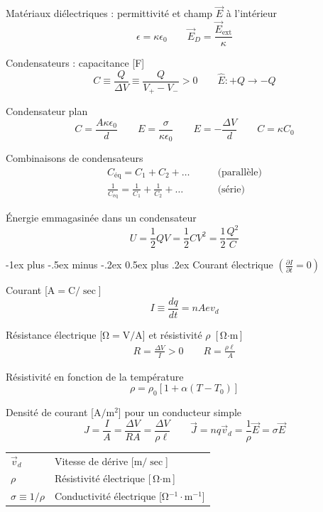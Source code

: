 \documentclass[10pt,landscape]{article}
\makeatletter
\renewcommand{\section}{\@startsection{section}{1}{0mm}%
                                {-1ex plus -.5ex minus -.2ex}%
                                {0.5ex plus .2ex}%
                                {\normalfont\large\bfseries}}
\newcommand{\halfline}{\vspace{0.5em}}
\newcommand{\tableindent}{\hspace{1.5em}}
\newcommand{\uvec}[1]{\ensuremath{{\hat{#1}}}}
\makeatother
\begin{document}
\begin{multicols}{3}
Matériaux diélectriques : permittivité et champ $\vec{E}$ à l'intérieur
\[ \epsilon = \kappa \epsilon_0 
\qquad\vec{E}_D = \frac{\vec{E}_\text{ext}}{\kappa}\]

Condensateurs : capacitance [\si{\farad}] 
\[ C \equiv \frac{Q}{\Delta V} \equiv \frac{Q}{V_+ - V_-} > 0 
\qquad \uvec{E}: +Q \to -Q \]

Condensateur plan \[ C = \frac{A\kappa\epsilon_0}{d} 
\qquad 
E = \frac{\sigma}{\kappa\epsilon_0}
\qquad
E =  -\frac{\Delta V}{d} 
\qquad
C = \kappa C_0 \]

Combinaisons de condensateurs \begin{align*}
C_\text{éq} = C_1 + C_2 + \dots  \qquad &\text{(parallèle)} \\
\frac{1}{C_\text{éq}} = \frac{1}{C_1} + \frac{1}{C_2} + \dots \qquad &\text{(série)}
\end{align*}


Énergie emmagasinée dans un condensateur
\[ U = \frac{1}{2} QV = \frac{1}{2} CV^2 = \frac{1}{2}\frac{Q^2}{C} \]


\hrulefill

\section{Courant électrique $\left(\frac{\partial I}{\partial t} = 0 \right)$}

Courant [$\si{\ampere} = \si{\coulomb}/\si{\sec}$]
\[ I \equiv \frac{dq}{dt} = n A e v_d \]

Résistance électrique [$\si{\ohm} = \si{\volt/\ampere}$] et résistivité $\rho$ [$\si{\ohm\cdot\meter}$]
\begin{gather*}
R = \frac{\Delta V}{I}  > 0   \qquad 
R = \frac{\rho \ell}{A}
\end{gather*}

Résistivité en fonction de la température
\[ \rho = \rho_0[1 + \alpha(T-T_0)] \]

Densité de courant [$\si{\ampere/\meter^2}$] pour un conducteur simple
\[ J = \frac{I}{A} = \frac{\Delta V}{RA} =  \frac{\Delta V}{\rho \ell} 
\qquad \vec{J} = n q \vec{v}_d  = \frac{1}{\rho}\vec{E} = \sigma \vec{E} \]

\begin{tabular}{@{\tableindent}ll@{}}
	$\vec{v}_d$ & Vitesse de dérive [$\si{\metre/\sec}$] \\
	$\rho$ & Résistivité électrique  [$\si{\ohm\cdot\meter}$] \\
	$\sigma \equiv 1/\rho$ & Conductivité électrique [$\si{\ohm^{-1}\cdot\meter^{-1}}$] \\
\end{tabular}
\halfline


\end{multicols}
\end{document}
